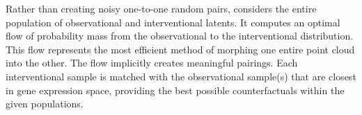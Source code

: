 Rather than creating noisy one-to-one random pairs,  considers the entire population of observational and interventional latents. 
It computes an optimal flow of probability mass from the observational to the interventional distribution. This flow represents the most efficient method of morphing one entire point cloud into the other. The flow implicitly creates meaningful pairings.
Each interventional sample is matched with the observational sample(s) that are closest in gene expression space, providing the best possible counterfactuals within the given populations.

